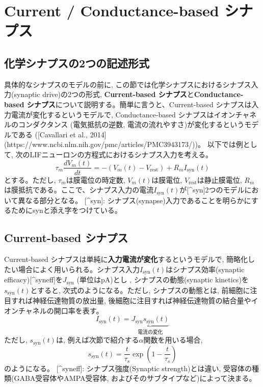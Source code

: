 \section{Current / Conductance-based シナプス}
\subsection{化学シナプスの2つの記述形式}
具体的なシナプスのモデルの前に, この節では化学シナプスにおけるシナプス入力(synaptic drive)の2つの形式, \textbf{Current-based シナプス}と\textbf{Conductance-based シナプス}について説明する。簡単に言うと、Current-based シナプスは入力電流が変化するというモデルで, Conductance-based シナプスはイオンチャネルのコンダクタンス (電気抵抗の逆数, 電流の流れやすさ)が変化するというモデルである ([Cavallari et al., 2014](https://www.ncbi.nlm.nih.gov/pmc/articles/PMC3943173/))。
以下では例として, 次のLIFニューロンの方程式におけるシナプス入力を考える。
\begin{equation}
\tau_m \frac{dV_{m}(t)}{dt}=-(V_{m}(t)-V_\text{rest})+R_m I_{\text{syn}}(t)    
\end{equation}
とする。ただし, $\tau_m$は膜電位の時定数, $V_m(t)$は膜電位, $V_\text{rest}$は静止膜電位, $R_m$は膜抵抗である。ここで、シナプス入力の電流$I_{\text{syn}}(t)$が[^syn]2つのモデルにおいて異なる部分となる。
[^syn]: シナプス(synapse)入力であることを明らかにするためにsynと添え字をつけている。
\subsection{Current-based シナプス}
Current-based シナプスは単純に\textbf{入力電流が変化}するというモデルで, 簡略化したい場合によく用いられる。シナプス入力$I_{\text{syn}}(t)$はシナプス効率(synaptic efficacy)[^syneff]を$J_{\text{syn}}$ (単位はpA)とし , シナプスの動態(synaptic kinetics)を$s_{\text{syn}}(t)$とすると, 次式のようになる。ただし, シナプスの動態とは, 前細胞に注目すれば神経伝達物質の放出量, 後細胞に注目すれば神経伝達物質の結合量やイオンチャネルの開口率を表す。
\begin{equation}
I_{\text{syn}}(t)=\underbrace{J_{\text{syn}}s_{\text{syn}}(t)}_{電流の変化}    
\end{equation}
ただし, $s_{\text{syn}}(t)$は, 例えば次節で紹介する$\alpha$関数を用いる場合, 
\begin{equation}
s_{\text{syn}}(t)=\dfrac{t}{\tau_s} \exp \left(1-\dfrac{t}{\tau_s}\right)    
\end{equation}
のようになる。
[^syneff]: シナプス強度(Synaptic strength)とは違い, 受容体の種類(GABA受容体やAMPA受容体,  およびそのサブタイプなど)によって決まる。
